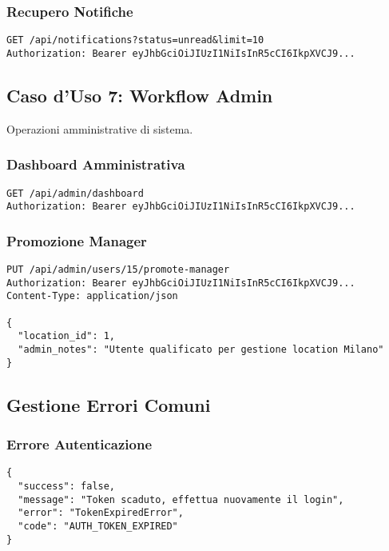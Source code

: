 \subsubsection{Recupero Notifiche}
\begin{lstlisting}[style=httpstyle, caption=Lista Notifiche Utente]
GET /api/notifications?status=unread&limit=10
Authorization: Bearer eyJhbGciOiJIUzI1NiIsInR5cCI6IkpXVCJ9...
\end{lstlisting}

\subsection{Caso d'Uso 7: Workflow Admin}
Operazioni amministrative di sistema.

\subsubsection{Dashboard Amministrativa}
\begin{lstlisting}[style=httpstyle, caption=Statistiche Sistema]
GET /api/admin/dashboard
Authorization: Bearer eyJhbGciOiJIUzI1NiIsInR5cCI6IkpXVCJ9...
\end{lstlisting}

\subsubsection{Promozione Manager}
\begin{lstlisting}[style=httpstyle, caption=Promuovi Utente a Manager]
PUT /api/admin/users/15/promote-manager
Authorization: Bearer eyJhbGciOiJIUzI1NiIsInR5cCI6IkpXVCJ9...
Content-Type: application/json

{
  "location_id": 1,
  "admin_notes": "Utente qualificato per gestione location Milano"
}
\end{lstlisting}

\subsection{Gestione Errori Comuni}

\subsubsection{Errore Autenticazione}
\begin{lstlisting}[caption=Token Scaduto]
{
  "success": false,
  "message": "Token scaduto, effettua nuovamente il login",
  "error": "TokenExpiredError",
  "code": "AUTH_TOKEN_EXPIRED"
}
\end{lstlisting}

